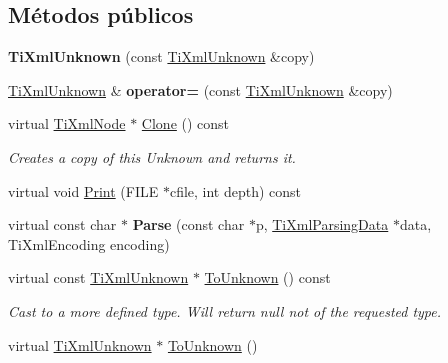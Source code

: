 \subsection*{\-Métodos públicos}
\begin{DoxyCompactItemize}
\item 
\hypertarget{classTiXmlUnknown_abe798ff4feea31474850c7f0de6bdf5e}{{\bfseries \-Ti\-Xml\-Unknown} (const \hyperlink{classTiXmlUnknown}{\-Ti\-Xml\-Unknown} \&copy)}\label{classTiXmlUnknown_abe798ff4feea31474850c7f0de6bdf5e}

\item 
\hypertarget{classTiXmlUnknown_a60560b5aacb4bdc8b2b5f02f0a99c5c0}{\hyperlink{classTiXmlUnknown}{\-Ti\-Xml\-Unknown} \& {\bfseries operator=} (const \hyperlink{classTiXmlUnknown}{\-Ti\-Xml\-Unknown} \&copy)}\label{classTiXmlUnknown_a60560b5aacb4bdc8b2b5f02f0a99c5c0}

\item 
\hypertarget{classTiXmlUnknown_a675c4b2684af35e4c7649b7fd5ae598d}{virtual \hyperlink{classTiXmlNode}{\-Ti\-Xml\-Node} $\ast$ \hyperlink{classTiXmlUnknown_a675c4b2684af35e4c7649b7fd5ae598d}{\-Clone} () const }\label{classTiXmlUnknown_a675c4b2684af35e4c7649b7fd5ae598d}

\begin{DoxyCompactList}\small\item\em \-Creates a copy of this \-Unknown and returns it. \end{DoxyCompactList}\item 
virtual void \hyperlink{classTiXmlUnknown_a025f19c21ef01ea9be50febb8fe0ba06}{\-Print} (\-F\-I\-L\-E $\ast$cfile, int depth) const 
\item 
\hypertarget{classTiXmlUnknown_aa51c2694e4177b5f0b5429ee5a81b58d}{virtual const char $\ast$ {\bfseries \-Parse} (const char $\ast$p, \hyperlink{classTiXmlParsingData}{\-Ti\-Xml\-Parsing\-Data} $\ast$data, \-Ti\-Xml\-Encoding encoding)}\label{classTiXmlUnknown_aa51c2694e4177b5f0b5429ee5a81b58d}

\item 
\hypertarget{classTiXmlUnknown_ab0313e5fe77987d746ac1a97a254419d}{virtual const \hyperlink{classTiXmlUnknown}{\-Ti\-Xml\-Unknown} $\ast$ \hyperlink{classTiXmlUnknown_ab0313e5fe77987d746ac1a97a254419d}{\-To\-Unknown} () const }\label{classTiXmlUnknown_ab0313e5fe77987d746ac1a97a254419d}

\begin{DoxyCompactList}\small\item\em \-Cast to a more defined type. \-Will return null not of the requested type. \end{DoxyCompactList}\item 
\hypertarget{classTiXmlUnknown_a67c9fd22940e8c47f706a72cdd2e332c}{virtual \hyperlink{classTiXmlUnknown}{\-Ti\-Xml\-Unknown} $\ast$ \hyperlink{classTiXmlUnknown_a67c9fd22940e8c47f706a72cdd2e332c}{\-To\-Unknown} ()}\label{classTiXmlUnknown_a67c9fd22940e8c47f706a72cdd2e332c}


\end{DoxyCompactItemize}
